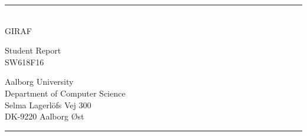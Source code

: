 \begin{titlepage}
    \addtolength{\hoffset}{0.5\evensidemargin-0.5\oddsidemargin}
    \noindent
    \vspace{1.5cm}
    \begin{center}
        \begin{spacing}{2.65} 
            \titlefont
            \TITLE
        \end{spacing}
        \vspace{-20pt}
        \textcolor{aaublue}{\rule{120pt}{2pt}}\\
        \vspace{10pt}
        {\subtitlefont
            GIRAF
        }
    \end{center}
    \vspace{4cm}
    \begin{center}
        \begin{spacing}{2}
            \subtitlefont
            Student Report\\
            SW618F16
        \end{spacing}
    \end{center}
    \vfill
    \noindent
\hfill
\begin{minipage}{0.5\linewidth}
    \begin{flushright}
        Aalborg University\\
        Department of Computer Science\\
        Selma Lagerl{\"o}fs Vej 300\\
        DK-9220 Aalborg {\O}st
    \end{flushright}
\end{minipage}
%
\begin{minipage}{0.02\linewidth}
    \textcolor{aaublue}{\rule{1pt}{5\baselineskip}}
\end{minipage}
    \titlepagedecoration
\end{titlepage}
\clearpage 